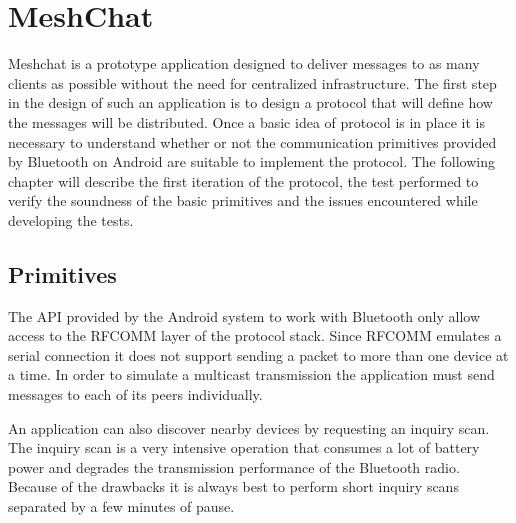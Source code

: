 \chapter{MeshChat}
Meshchat is a prototype application designed to deliver messages to as many clients as possible without the need for centralized infrastructure.
The first step in the design of such an application is to design a protocol that will define how the messages will be distributed.
Once a basic idea of protocol is in place it is necessary to understand whether or not the communication primitives provided by Bluetooth on Android are suitable to implement the protocol.
The following chapter will describe the first iteration of the protocol, the test performed to verify the soundness of the basic primitives and the issues encountered while developing the tests.

\section{Primitives}
The API provided by the Android system to work with Bluetooth only allow access to the RFCOMM layer of the protocol stack.
Since RFCOMM emulates a serial connection it does not support sending a packet to more than one device at a time.
In order to simulate a multicast transmission the application must send messages to each of its peers individually.

An application can also discover nearby devices by requesting an inquiry scan.
The inquiry scan is a very intensive operation that consumes a lot of battery power and degrades the transmission performance of the Bluetooth radio.
Because of the drawbacks it is always best to perform short inquiry scans separated by a few minutes of pause.

